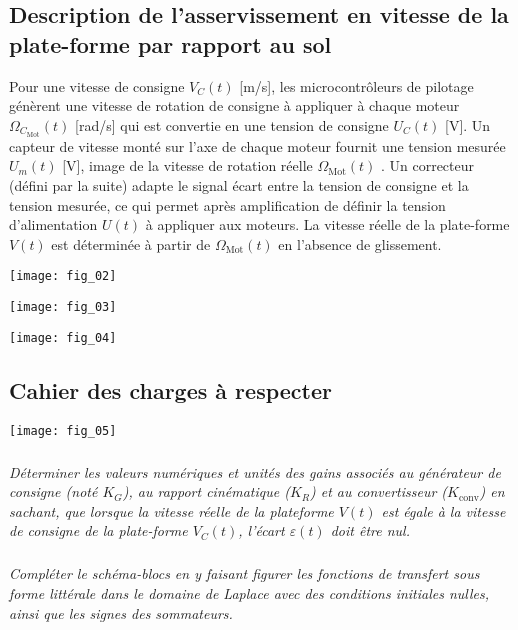 \begin{multicols}{2}
\subsection*{Description de l’asservissement en vitesse de la plate-forme par rapport au sol}
Pour une vitesse de consigne $V_C(t)$ [m/s], les microcontrôleurs de pilotage génèrent une vitesse de rotation de
consigne à appliquer à chaque moteur $\Omega_{C_{\text{Mot}}}(t)$ [rad/s] qui est convertie en une tension de consigne 
$U_C(t)$ [V]. Un capteur de vitesse monté sur l’axe de chaque moteur fournit une tension mesurée $U_m(t)$ [V], image de la vitesse de
rotation réelle $\Omega_{{\text{Mot}}}(t)$ . Un correcteur (défini par la suite) adapte le signal écart entre la tension de consigne et la tension mesurée, ce qui permet après amplification de définir la tension d’alimentation $U(t)$ à appliquer aux moteurs. La vitesse réelle de la plate-forme $V(t)$ est déterminée à partir de $\Omega_{{\text{Mot}}}(t)$ en l’absence de glissement.

\begin{center}
\texttt{[image: fig\_02]}
\end{center}

\begin{center}
\texttt{[image: fig\_03]}
\end{center}

\begin{center}
\texttt{[image: fig\_04]}
\end{center}

\subsection*{Cahier des charges à respecter}
\begin{center}
\texttt{[image: fig\_05]}
\end{center}


\subparagraph{}\textit{Déterminer les valeurs numériques et unités des gains associés au générateur de consigne (noté $K_G$), au rapport cinématique ($K_R$) et au convertisseur ($K_{\text{conv}}$) en sachant, que lorsque la vitesse réelle de la plateforme $V(t)$ est égale à la vitesse de consigne de la plate-forme $V_C(t)$, l’écart $\varepsilon(t)$ doit être nul.}
\ifprof
\begin{corrige}
\end{corrige}
\else
\fi


\subparagraph{}\textit{Compléter le schéma-blocs en y faisant figurer les fonctions de
transfert sous forme littérale dans le domaine de Laplace avec des conditions initiales nulles, ainsi que les
signes des sommateurs.}
\ifprof
\begin{corrige}
\end{corrige}
\else
\fi


\end{multicols}
